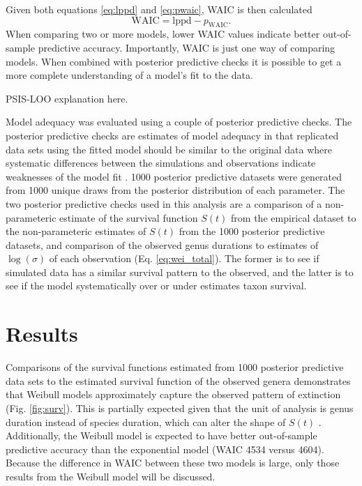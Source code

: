 \documentclass{article}
\begin{document}
Given both equations \ref{eq:lppd} and \ref{eq:pwaic}, WAIC is then calculated
\begin{equation}
  \mathrm{WAIC} = \mathrm{lppd} - p_{\mathrm{WAIC}}.
  \label{eq:waic}
\end{equation}
When comparing two or more models, lower WAIC values indicate better out-of-sample predictive accuracy. Importantly, WAIC is just one way of comparing models. When combined with posterior predictive checks it is possible to get a more complete understanding of a model's fit to the data.


PSIS-LOO explanation here.


Model adequacy was evaluated using a couple of posterior predictive checks. The posterior predictive checks are estimates of model adequacy in that replicated data sets using the fitted model should be similar to the original data where systematic differences between the simulations and observations indicate weaknesses of the model fit \citep{Gelman2013d}. 1000 posterior predictive datasets were generated from 1000 unique draws from the posterior distribution of each parameter. The two posterior predictive checks used in this analysis are a comparison of a non-parameteric estimate of the survival function \(S(t)\) from the empirical dataset to the non-parameteric estimates of \(S(t)\) from the 1000 posterior predictive datasets, and comparison of the observed genus durations to estimates of \(\log(\sigma)\) of each observation (Eq. \ref{eq:wei_total}). The former is to see if simulated data has a similar survival pattern to the observed, and the latter is to see if the model systematically over or under estimates taxon survival.





\section{Results}

Comparisons of the survival functions estimated from 1000 posterior predictive data sets to the estimated survival function of the observed genera demonstrates that Weibull models approximately capture the observed pattern of extinction (Fig. \ref{fig:surv}). This is partially expected given that the unit of analysis is genus duration instead of species duration, which can alter the shape of \(S(t)\) \citep{Raup1975,Raup1978,Raup1985,Foote2001a}. Additionally, the Weibull model is expected to have better out-of-sample predictive accuracy than the exponential model (WAIC 4534 versus 4604). Because the difference in WAIC between these two models is large, only those results from the Weibull model will be discussed.
\end{document}
